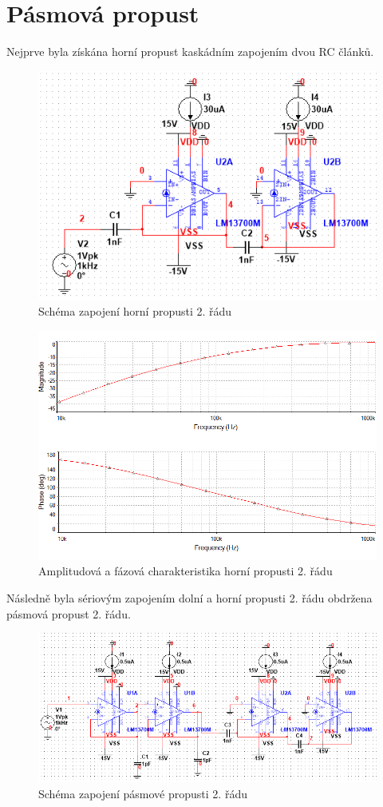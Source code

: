 \documentclass[twoside]{article}
\begin{document}
\section{Pásmová propust}
\noindent Nejprve byla získána horní propust kaskádním zapojením dvou RC článků.
\begin{figure}[H]
\centering
\includegraphics[scale=0.75]{1606.png}
\caption{Schéma zapojení horní propusti 2. řádu}
\end{figure}
\begin{figure}[H]
\centering
\includegraphics[scale=0.75]{16063.png}
\caption{Amplitudová a fázová charakteristika horní propusti 2. řádu}
\end{figure}
\noindent Následně byla sériovým zapojením dolní a horní propusti 2. řádu obdržena pásmová propust 2. řádu.
\begin{figure}[H]
\centering
\includegraphics[scale=0.75]{16064.png}
\caption{Schéma zapojení pásmové propusti 2. řádu}
\end{figure}
\end{document}
